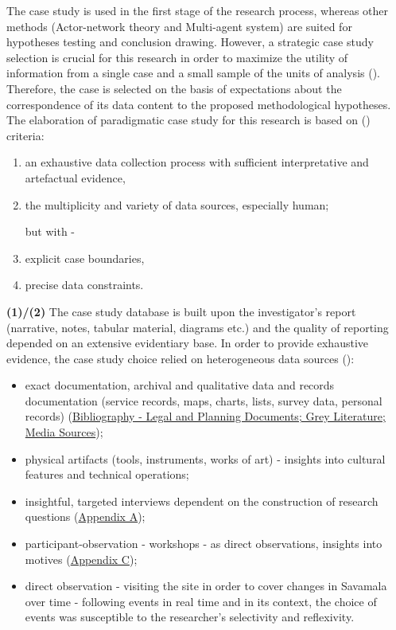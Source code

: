 \documentclass[11pt]{report}
\begin{document}
{{{{The case study is used in the first stage of the research process, whereas other methods (Actor-network theory and Multi-agent system) are suited for hypotheses testing and conclusion drawing. However, a strategic case study selection is crucial for this research in order to maximize the utility of information from a single case and a small sample of the units of analysis  (\href{Flyvbjerg}{\citealt{flyvbjerg_five_2006}}).
Therefore, the case is selected on the basis of expectations about the correspondence of its data content to the proposed methodological hypotheses. The elaboration of paradigmatic case study for this research is based on (\href{Yin}{\citealt{yin_case_2009}}) criteria:

\begin{enumerate}
\item an exhaustive data collection process with sufficient interpretative and artefactual evidence,
\item the multiplicity and variety of data sources, especially human;

but with - 
\item explicit case boundaries,
\item precise data constraints.
\end{enumerate}

\textbf{(1)/(2) }The case study database is built upon the investigator’s report (narrative, notes, tabular material, diagrams etc.) and the quality  of reporting depended on an extensive evidentiary base. In order to provide exhaustive evidence, the case study choice relied on heterogeneous data sources (\href{Yin}{\citealt{yin_case_2003}}):

\begin{itemize}
\item exact documentation, archival and qualitative data and records documentation (service records, maps, charts, lists, survey data, personal records) (\href{Bibliography}{Bibliography - Legal and Planning Documents; Grey Literature; Media Sources});
\item physical artifacts (tools, instruments, works of art) - insights into cultural features and technical operations;
\item insightful, targeted interviews dependent  on the construction of research questions (\href{Appendix}{Appendix A});
\item participant-observation - workshops -  as direct observations, insights into motives (\href{Appendix}{Appendix C});
\item direct observation - visiting the site in order to cover changes in Savamala over time
- following events in real time and in its context, the choice of events was susceptible to the researcher’s selectivity and reflexivity.
\end{itemize}

}}}}
\end{document}
